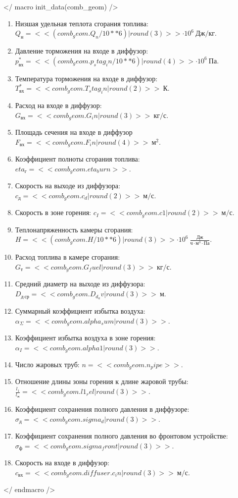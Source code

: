 \documentclass[a4paper,10pt]{article}
\begin{document}
    </ macro init_data(comb_geom) />
    \begin{enumerate}
        \item Низшая удельная теплота сгорания топлива: $ Q_н = << (comb_geom.Q_n / 10**6) | round(3) >> \cdot 10^6\ Дж/кг $.
        \item Давление торможения на входе в диффузор: $ p_{вх}^* = << (comb_geom.p_stag_in / 10**6) | round(4) >> \cdot 10^6\  Па$.
        \item Температура торможения на входе в диффузор: $ T_{вх}^* = << comb_geom.T_stag_in | round(2) >>\ К $.
        \item Расход на входе в диффузор: $G_{вх} = << comb_geom.G_in | round(3) >>\ кг/с$.
        \item Площадь сечения на входе в диффузор $ F_{вх} = << comb_geom.F_in | round(4) >>\ м^2 $.
        \item Коэффициент полноты сгорания топлива: $eta_{г} = << comb_geom.eta_burn >>$.
        \item Скорость на выходе из диффузора: $c_{д} = << comb_geom.c_d | round(2) >>\ м/с$.
        \item Скорость в зоне горения: $c_I = << comb_geom.c1 | round(2) >>\ м/с$.
        \item Теплонапряженность камеры сгорания: $H = << (comb_geom.H / 10**6) | round(3) >> \cdot10^6\ \frac{Дж}{ч \cdot м^3 \cdot Па}$.
        \item Расход топлива в камере сгорания: $G_т = << comb_geom.G_fuel | round(3) >>\ кг/с$.
        \item Средний диаметр на выходе из диффузора: $D_{д\ ср} = << comb_geom.D_d_av | round(3) >>\ м$.
        \item Суммарный коэффициент избытка воздуха: $\alpha_{\Sigma} = << comb_geom.alpha_sum | round(3) >>$.
        \item Коэффициент избытка воздуха в зоне горения: $\alpha_I = << comb_geom.alpha1 | round(3) >>$.
        \item Число жаровых труб: $n = << comb_geom.n_pipe >>$.
        \item Отношение длины зоны горения к длине жаровой трубы: $\frac{l_1}{l_ж} = << comb_geom.l1_rel | round(3) >>$.
        \item Коэффициент сохранения полного давления в диффузоре: $\sigma_д = << comb_geom.sigma_d | round(3) >>$.
        \item Коэффициент сохранения полного давления во фронтовом устройстве: $\sigma_ф = << comb_geom.sigma_front | round(3) >>$.
        \item Скорость на входе в диффузор: $c_{вх} = << comb_geom.diffuser.c_in | round(3)>>\ м/с$.
    \end{enumerate}
    </ endmacro />
\end{document}
